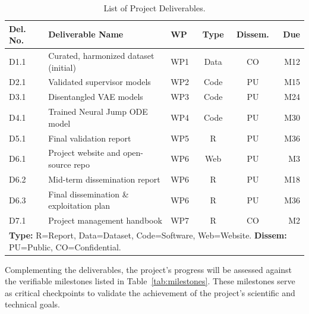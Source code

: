 \documentclass[11pt, a4paper]{article}
\begin{document}
\begin{table}[H]
    \centering
    \caption{List of Project Deliverables.}
    \label{tab:deliverables}
    \small
    \begin{tabular}{lp{5.5cm}lccr}
        \toprule
        \textbf{Del. No.} & \textbf{Deliverable Name} & \textbf{WP} & \textbf{Type} & \textbf{Dissem.} & \textbf{Due} \\
        \midrule
        D1.1 & Curated, harmonized dataset (initial) & WP1 & Data & CO & M12 \\
        D2.1 & Validated supervisor models & WP2 & Code & PU & M15 \\
        D3.1 & Disentangled VAE models & WP3 & Code & PU & M24 \\
        D4.1 & Trained Neural Jump ODE model & WP4 & Code & PU & M30 \\
        D5.1 & Final validation report & WP5 & R & PU & M36 \\
        D6.1 & Project website and open-source repo & WP6 & Web & PU & M3 \\
        D6.2 & Mid-term dissemination report & WP6 & R & PU & M18 \\
        D6.3 & Final dissemination \& exploitation plan & WP6 & R & PU & M36 \\
        D7.1 & Project management handbook & WP7 & R & CO & M2 \\
        \bottomrule
        \multicolumn{6}{p{13cm}}{\footnotesize \textbf{Type:} R=Report, Data=Dataset, Code=Software, Web=Website. \textbf{Dissem:} PU=Public, CO=Confidential.}
    \end{tabular}
\end{table}

Complementing the deliverables, the project's progress will be assessed against the verifiable milestones listed in Table~\ref{tab:milestones}. These milestones serve as critical checkpoints to validate the achievement of the project's scientific and technical goals.
\end{document}
